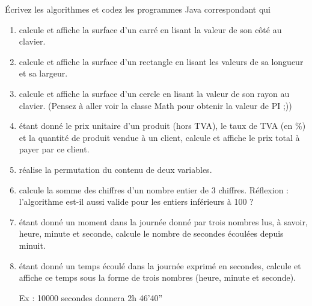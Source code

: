 \documentclass[11pt,a4paper]{article}
\begin{document}
            \par
        
        \'Ecrivez les algorithmes et codez les programmes Java correspondant qui 
          
					\begin{enumerate}
				
			\item calcule et affiche la surface d'un carr\'e en lisant la valeur de son c\^ot\'e au clavier.
			\item calcule et affiche la surface d'un rectangle  en lisant les valeurs de sa longueur et sa largeur.
			\item calcule et affiche la surface d'un cercle en lisant la valeur de son rayon au clavier.  (Pensez \`a aller voir la classe Math pour obtenir la valeur de PI ;))
			\item \'etant donn\'e le prix unitaire d'un produit (hors TVA), le taux de TVA (en \%) 
            et la quantit\'e de produit vendue \`a un client, calcule et affiche le prix total \`a payer par ce client.
			\item r\'ealise la permutation du contenu de deux variables.
			\item calcule la somme des chiffres d'un nombre entier de 3 chiffres. R\'eflexion : l'algorithme est-il aussi valide pour les entiers inf\'erieurs \`a 100 ?
			\item \'etant donn\'e un moment dans la journ\'ee donn\'e par trois nombres lus, \`a savoir, heure, minute et seconde, calcule le nombre de secondes \'ecoul\'ees depuis minuit.
			\item \'etant donn\'e un temps \'ecoul\'e dans la journ\'ee exprim\'e en secondes, calcule et affiche ce temps sous la forme de trois nombres (heure, minute et seconde). \par
				
            Ex : 10000 secondes donnera 2h 46'40”
					\end{enumerate}
				
            \par
        
				
\end{document}
